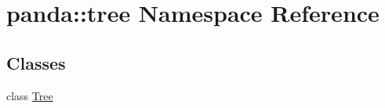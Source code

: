 \hypertarget{namespacepanda_1_1tree}{
\section{panda::tree Namespace Reference}
\label{namespacepanda_1_1tree}
}
\subsection*{Classes}
\begin{DoxyCompactItemize}
\item 
class \hyperlink{classpanda_1_1tree_1_1Tree}{Tree}
\end{DoxyCompactItemize}

